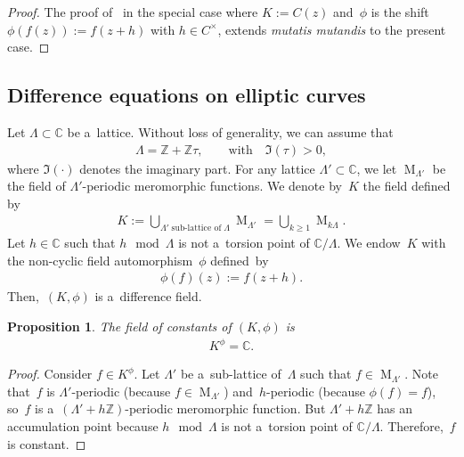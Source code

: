\documentclass[pdftex]{sigma}
\numberwithin{equation}{section}
\newtheorem{Proposition}[Theorem]{Proposition}
{ \theoremstyle{definition}
\newtheorem{Definition}[Theorem]{Definition}
\newtheorem{Remark}[Theorem]{Remark} }
\begin{document}
\begin{proof}
The proof of~\cite[Propositions~1.20 and~1.21]{VdPS97} in the special case where $K:=C(z)$ and~$\phi$ is the shift
$\phi(f(z)):=f(z+h)$ with $h \in C^\times$, extends {\it mutatis mutandis} to the present case.
\end{proof}

\subsection{Dif\/ference equations on elliptic curves}

Let $\Lambda \subset \mathbb C$ be a~lattice.
Without loss of generality, we can assume that
\begin{gather*}
\Lambda=\mathbb Z +\mathbb Z \tau, \qquad \text{with} \quad \Im (\tau)>0,
\end{gather*}
where $\Im(\cdot)$ denotes the imaginary part.
For any lattice $\Lambda' \subset \mathbb C$, we let $\operatorname{M}_{\Lambda'}$ be the f\/ield of $\Lambda'$-periodic
meromorphic functions.
We denote by~$K$ the f\/ield def\/ined by
\begin{gather*}
K:= \bigcup_{\Lambda' \; \text{sub-lattice of} \; \Lambda} \operatorname{M}_{\Lambda'} =\bigcup_{k \geq 1} \operatorname{M}_{k  \Lambda}.
\end{gather*}
Let $h \in \mathbb C$ such that $h \mod \Lambda$ is not a~torsion point of $\mathbb C/\Lambda$.
We endow~$K$ with the non-cyclic f\/ield automorphism~$\phi$ def\/ined~by
\begin{gather*}
\phi(f)(z):=f(z+h).
\end{gather*}
Then,~$(K,\phi)$ is a~dif\/ference f\/ield.

\begin{Proposition}
The field of constants of $(K,\phi)$ is
\begin{gather*}
K^{\phi}=\mathbb C.
\end{gather*}
\end{Proposition}

\begin{proof}
Consider $f\in K^{\phi}$.
Let $\Lambda'$ be a~sub-lattice of~$\Lambda$ such that $f \in \operatorname{M}_{\Lambda'}$.
Note that~$f$ is $\Lambda'$-periodic (because $f \in \operatorname{M}_{\Lambda'}$) and~$h$-periodic (because
$\phi(f)=f$), so~$f$ is a~$(\Lambda' + h\mathbb Z)$-periodic meromorphic function.
But $\Lambda' + h\mathbb Z$ has an accumulation point because $h \mod \Lambda$ is not a~torsion point of $\mathbb
C/\Lambda$.
Therefore,~$f$ is constant.
\end{proof}
\end{document}
